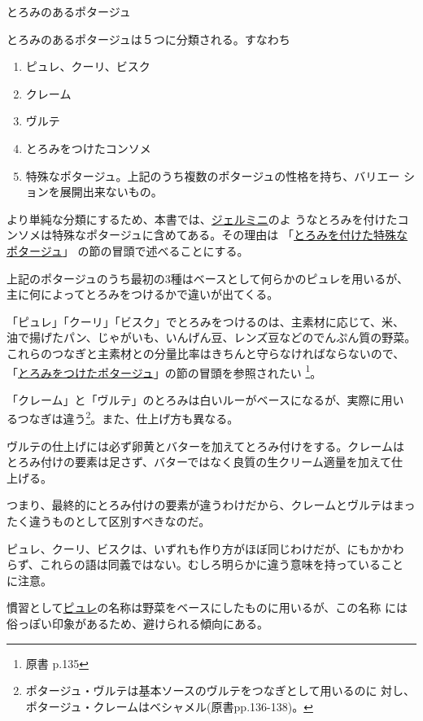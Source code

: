 
とろみのあるポタージュ

とろみのあるポタージュは５つに分類される。すなわち

\begin{enumerate}
\def\labelenumi{\arabic{enumi}.}
\item
  ピュレ、クーリ、ビスク
\item
  クレーム
\item
  ヴルテ
\item
  とろみをつけたコンソメ
\item
  特殊なポタージュ。上記のうち複数のポタージュの性格を持ち、バリエー
  ションを展開出来ないもの。
\end{enumerate}

より単純な分類にするため、本書では、\protect\hyperlink{potage-germiny}{ジェルミニ}のよ
うなとろみを付けたコンソメは特殊なポタージュに含めてある。その理由は
「\protect\hyperlink{series-de-potages-lie-speciaux}{とろみを付けた特殊なポタージュ}」
の節の冒頭で述べることにする。

上記のポタージュのうち最初の3種はベースとして何らかのピュレを用いるが、
主に何によってとろみをつけるかで違いが出てくる。

「ピュレ」「クーリ」「ビスク」でとろみをつけるのは、主素材に応じて、米、
油で揚げたパン、じゃがいも、いんげん豆、レンズ豆などのでんぷん質の野菜。
これらのつなぎと主素材との分量比率はきちんと守らなければならないので、
「\protect\hyperlink{potages-lies}{とろみをつけたポタージュ}」の節の冒頭を参照されたい
\footnote{原書 p.135}。

「クレーム」と「ヴルテ」のとろみは白いルーがベースになるが、実際に用い
るつなぎは違う\footnote{ポタージュ・ヴルテは基本ソースのヴルテをつなぎとして用いるのに
  対し、ポタージュ・クレームはベシャメル(原書pp.136-138)。}。また、仕上げ方も異なる。

ヴルテの仕上げには必ず卵黄とバターを加えてとろみ付けをする。クレームは
とろみ付けの要素は足さず、バターではなく良質の生クリーム適量を加えて仕
上げる。

つまり、最終的にとろみ付けの要素が違うわけだから、クレームとヴルテはまっ
たく違うものとして区別すべきなのだ。

ピュレ、クーリ、ビスクは、いずれも作り方がほぼ同じわけだが、にもかかわ
らず、これらの語は同義ではない。むしろ明らかに違う意味を持っていること
に注意。

慣習として\ul{ピュレ}の名称は野菜をベースにしたものに用いるが、この名称
には俗っぽい印象があるため、避けられる傾向にある。


